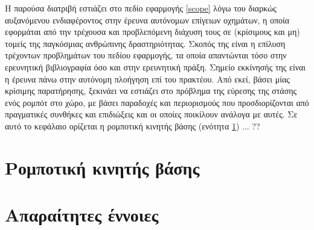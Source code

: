 Η παρούσα διατριβή εστιάζει στο πεδίο εφαρμογής \ref{scope} λόγω του διαρκώς
αυξανόμενου ενδιαφέροντος στην έρευνα αυτόνομων επίγειων οχημάτων, η οποία
εφορμάται από την τρέχουσα και προβλεπόμενη διάχυση τους σε (κρίσιμους και μη)
τομείς της παγκόσμιας ανθρώπινης δραστηριότητας. Σκοπός της είναι η επίλυση
τρέχοντων προβλημάτων του πεδίου εφαρμογής, τα οποία απαντώνται τόσο στην
ερευνητική βιβλιογραφία όσο και στην ερευνητική πράξη. Σημείο εκκίνησής της
είναι η έρευνα πάνω στην αυτόνομη πλοήγηση επί του πρακτέου. Από εκεί, βάσει
μίας κρίσιμης παρατήρησης, ξεκινάει να εστιάζει στο πρόβλημα της εύρεσης της
στάσης ενός ρομπότ στο χώρο, με βάσει παραδοχές και περιορισμούς που
προσδιορίζονται από πραγματικές συνθήκες και επιδιώξεις και οι οποίες ποικίλουν
ανάλογα με αυτές. Σε αυτό το κεφάλαιο ορίζεται η ρομποτική κινητής βάσης
(ενότητα \ref{section:01_01_01}) ... ??


\section{Ρομποτική κινητής βάσης}
\label{section:01_01_01}


\section{Απαραίτητες έννοιες}
\label{section:01_01_02}

